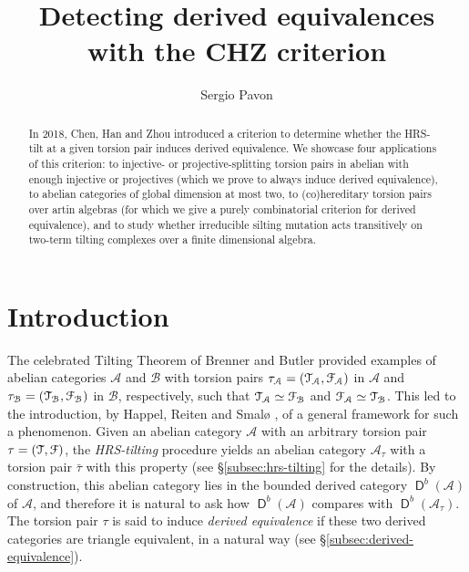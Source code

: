 \documentclass[a4paper,11pt]{amsart}
\theoremstyle{plain}
\theoremstyle{definition}
\newcommand{\Acal}{\mathcal{A}} \newcommand{\Bcal}{\mathcal{B}} \newcommand{\Ccal}{\mathcal{C}}
\DeclareMathOperator{\D}{\mathsf{D}}
\begin{document}
\title{Detecting derived equivalences with the CHZ criterion}
\author{Sergio Pavon}
\address[Sergio Pavon]{Dipartimento di Informatica, Università degli Studi di
Verona, Strada le Grazie 15 37134 Verona, Italy.}

\begin{abstract}
	In 2018, Chen, Han and Zhou introduced a criterion to determine whether the
	HRS-tilt at a given torsion pair induces derived equivalence. We showcase four
	applications of this criterion: to injective- or projective-splitting torsion
	pairs in abelian with enough injective or projectives
	(which we prove to always induce derived equivalence), to abelian
	categories of global dimension at most two, to (co)hereditary torsion pairs
	over artin algebras (for which we give a purely combinatorial criterion for
	derived equivalence), and to study whether irreducible silting mutation acts
	transitively on two-term tilting complexes over a finite dimensional algebra.
\end{abstract}

\maketitle

\section*{Introduction}

The celebrated Tilting Theorem of Brenner and Butler \cite{bren-butl-80} provided examples
of abelian categories $\Acal$ and $\Bcal$ with torsion pairs
$\tau_\Acal=(\Tcal_\Acal,\Fcal_\Acal)$ in $\Acal$ and
$\tau_\Bcal=(\Tcal_\Bcal,\Fcal_\Bcal)$ in $\Bcal$, respectively, such that
$\Tcal_\Acal\simeq\Fcal_\Bcal$ and $\Fcal_\Acal\simeq\Tcal_\Bcal$. This led to
the introduction, by Happel, Reiten and Smalø \cite{happ-reit-smal-96}, of a general framework
for such a phenomenon. Given an abelian category $\Acal$ with an arbitrary
torsion pair $\tau=(\mathcal{T},\mathcal{F})$, the \emph{HRS-tilting} procedure yields an
abelian category $\Acal_\tau$ with a torsion pair $\bar\tau$ with this property
(see \S\ref{subsec:hrs-tilting} for the details). By construction, this abelian
category lies in the bounded derived category $\D^b(\Acal)$ of $\Acal$, and
therefore it is natural to ask how $\D^b(\Acal)$ compares with
$\D^b(\Acal_\tau)$. The torsion pair $\tau$ is said to induce \emph{derived
equivalence} if these two derived categories are triangle equivalent, in a
natural way (see \S\ref{subsec:derived-equivalence}).
\end{document}

